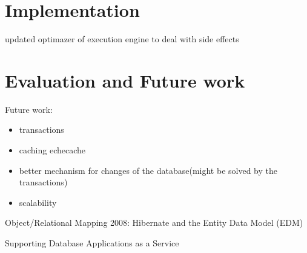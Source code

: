 \documentclass[a4paper, notitlepage]{article}
\begin{document}
\section{Implementation}

updated optimazer of execution engine to deal with side effects

\section{Evaluation and Future work}

Future work:
\begin{itemize}
\item transactions
\item caching echecache
\item better mechanism for changes of the database(might be solved by the transactions)
\item scalability
\end{itemize}

\begin{thebibliography}{99}

 Object/Relational Mapping 2008: Hibernate and the Entity Data Model (EDM)

 Supporting Database Applications as a Service

\end{thebibliography}
\end{document}
